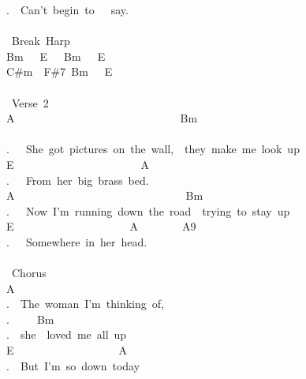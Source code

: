 {.\ \ Can't\ begin\ to\ \ \ say.\\
\\
\lbrack\ Break\ Harp\rbrack\ \ \ \ \ \ \ \ \ \ \ \ \ \ \ \ \ \ \ \ \ \ \ \ \ \ \ \\
Bm\ \ \ E\ \ \ Bm\ \ \ E\ \ \ \ \ \ \ \ \ \ \ \ \ \ \ \ \ \ \ \ \ \ \ \ \ \ \ \ \ \ \ \ \ \ \ \\
C\#m\ \ F\#7\ Bm\ \ \ E\ \\
\ \ \ \ \ \ \ \ \ \ \ \ \ \ \ \ \ \ \ \ \ \ \ \ \ \ \ \ \ \ \ \ \ \ \\
\lbrack\ Verse\ 2\rbrack\\
A\ \ \ \ \ \ \ \ \ \ \ \ \ \ \ \ \ \ \ \ \ \ \ \ \ \ \ \ \ \ Bm\ \ \ \ \ \ \ \ \ \ \ \ \ \ \ \ \ \ \ \ \ \ \ \ \ \ \ \ \ \ \ \ \ \ \ \ \ \ \ \ \ \ \ \ \ \ \ \ \ \ \\
.\ \ \ She\ got\ pictures\ on\ the\ wall,\ \ they\ make\ me\ look\ up\\
E\ \ \ \ \ \ \ \ \ \ \ \ \ \ \ \ \ \ \ \ \ \ \ A\\
.\ \ \ From\ her\ big\ brass\ bed.\ \ \\
A\ \ \ \ \ \ \ \ \ \ \ \ \ \ \ \ \ \ \ \ \ \ \ \ \ \ \ \ \ \ \ Bm\ \ \ \ \ \ \ \ \ \ \ \ \ \ \ \ \ \ \ \ \ \ \ \ \\
.\ \ \ Now\ I'm\ running\ down\ the\ road\ \ trying\ to\ stay\ up\\
E\ \ \ \ \ \ \ \ \ \ \ \ \ \ \ \ \ \ \ \ \ A\ \ \ \ \ \ \ \ A9\ \\
.\ \ \ Somewhere\ in\ her\ head.\ \ \ \ \ \ \ \ \ \ \ \ \ \ \ \ \ \ \ \ \ \ \ \ \ \ \ \\
\\
\lbrack\ Chorus\rbrack\ \ \ \ \ \ \ \ \ \ \ \ \ \ \ \ \ \ \ \ \ \ \ \ \ \ \ \ \ \ \ \ \ \ \ \ \ \ \ \ \ \\
A\ \ \ \ \ \ \ \ \ \ \ \ \ \ \ \ \ \ \ \ \ \ \ \ \ \ \ \ \ \ \ \ \ \ \ \ \ \ \ \ \ \ \ \ \ \ \ \ \ \\
.\ \ The\ woman\ I'm\ thinking\ of,\ \ \ \ \ \ \ \ \ \ \ \ \ \ \ \ \ \ \ \ \ \ \\
.\ \ \ \ \ Bm\ \ \ \ \ \ \ \ \ \ \ \ \ \ \ \ \ \ \ \ \ \ \ \ \ \ \ \ \ \ \ \ \ \ \ \ \ \ \ \ \ \ \ \ \ \ \ \ \\
.\ \ she\ \ loved\ me\ all\ up\ \ \ \ \ \ \ \ \ \ \ \ \ \ \ \ \ \ \ \ \ \ \ \ \ \ \ \ \ \\
E\ \ \ \ \ \ \ \ \ \ \ \ \ \ \ \ \ \ \ A\ \ \ \ \ \ \ \ \ \ \ \ \ \ \ \ \ \ \ \ \ \ \ \ \ \ \ \ \ \\
.\ \ But\ I'm\ so\ down\ today\ \ \ \ \ \ \ \ \ \ \ \ \ \ \ \ \ \ \ \ \ \ \ \ \ \ \ \\
}
